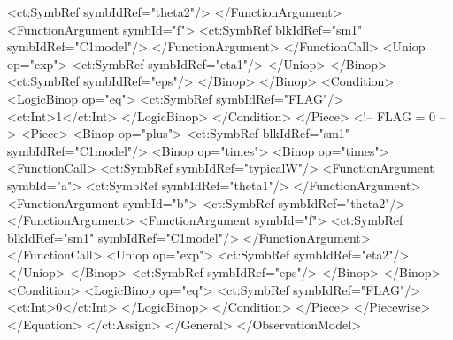 \documentclass[a4paper,10pt]{article}
\begin{document}
\begin{xmlcode}
                                            <ct:SymbRef symbIdRef="theta2"/>
                                        </FunctionArgument>
                                        <FunctionArgument symbId="f">
                                            <ct:SymbRef blkIdRef="sm1" symbIdRef="C1model"/>
                                        </FunctionArgument>
                                    </FunctionCall>
                                    <Uniop op="exp">
                                        <ct:SymbRef symbIdRef="eta1"/>
                                    </Uniop>
                                </Binop>
                                <ct:SymbRef symbIdRef="eps"/>
                            </Binop>
                        </Binop>
                        <Condition>
                            <LogicBinop op="eq">
                                <ct:SymbRef symbIdRef="FLAG"/>
                                <ct:Int>1</ct:Int>
                            </LogicBinop>
                        </Condition>
                    </Piece>                                <!-- FLAG = 0 -->
                    <Piece>
                        <Binop op="plus">
                            <ct:SymbRef blkIdRef="sm1" symbIdRef="C1model"/>
                            <Binop op="times">
                                <Binop op="times">
                                    <FunctionCall>
                                        <ct:SymbRef symbIdRef="typicalW"/>
                                        <FunctionArgument symbId="a">
                                            <ct:SymbRef symbIdRef="theta1"/>
                                        </FunctionArgument>
                                        <FunctionArgument symbId="b">
                                            <ct:SymbRef symbIdRef="theta2"/>
                                        </FunctionArgument>
                                        <FunctionArgument symbId="f">
                                            <ct:SymbRef blkIdRef="sm1" symbIdRef="C1model"/>
                                        </FunctionArgument>
                                    </FunctionCall>
                                    <Uniop op="exp">
                                        <ct:SymbRef symbIdRef="eta2"/>
                                    </Uniop>
                                </Binop>
                                <ct:SymbRef symbIdRef="eps"/>
                            </Binop>
                        </Binop>
                        <Condition>
                            <LogicBinop op="eq">
                                <ct:SymbRef symbIdRef="FLAG"/>
                                <ct:Int>0</ct:Int>
                            </LogicBinop>
                        </Condition>
                    </Piece>
                </Piecewise>
            </Equation>
        </ct:Assign>
    </General>
</ObservationModel>
\end{xmlcode}
\end{document}
